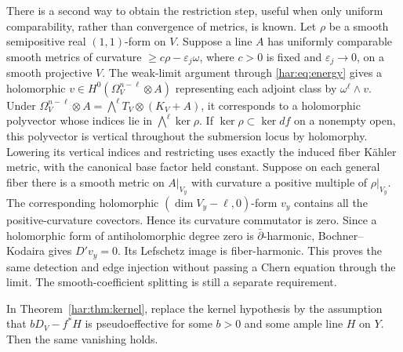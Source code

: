 \begin{remark}\label{har:rem:polyvector}
There is a second way to obtain the restriction step, useful when only
uniform comparability, rather than convergence of metrics, is known.
Let \(\rho\) be a smooth semipositive real \((1,1)\)-form on \(V\). Suppose a line \(A\) has uniformly comparable smooth metrics of curvature
\(\ge c\rho-\varepsilon_j\omega\), where \(c>0\) is fixed and \(\varepsilon_j\to0\), on a smooth projective \(V\).
The weak-limit argument through \eqref{har:eq:energy} gives a holomorphic
\(v\in H^0(\Omega_V^{n-\ell}\otimes A)\) representing each adjoint class
by \(\omega^\ell\wedge v\). Under
\(\Omega_V^{n-\ell}\otimes A=\bigwedge^\ell T_V\otimes(K_V+A)\),
it corresponds to a holomorphic polyvector whose indices lie in
\(\bigwedge^\ell\ker\rho\). If \(\ker\rho\subset\ker df\) on a
nonempty open, this polyvector is vertical throughout the submersion
locus by holomorphy. Lowering its vertical indices and restricting uses
exactly the induced fiber Kähler metric, with the canonical base factor
held constant. Suppose on each general fiber there is a smooth metric
on \(A|_{V_y}\) with curvature a positive multiple of \(\rho|_{V_y}\).
The corresponding holomorphic \((\dim V_y-\ell,0)\)-form \(v_y\)
contains all the positive-curvature covectors. Hence its curvature
commutator is zero. Since a holomorphic form of antiholomorphic degree
zero is \(\bar\partial\)-harmonic, Bochner--Kodaira gives \(D'v_y=0\).
Its Lefschetz image is fiber-harmonic. This proves the same detection
and edge injection without passing a Chern equation through the limit.
The smooth-coefficient splitting is still a separate requirement.
\end{remark}

\begin{proposition}\label{har:prop:dominationvanish}
In Theorem~\ref{har:thm:kernel}, replace the kernel hypothesis by the
assumption that \(bD_V-f^*H\) is pseudoeffective for some \(b>0\) and
some ample line \(H\) on \(Y\). Then the same vanishing holds.
\end{proposition}

